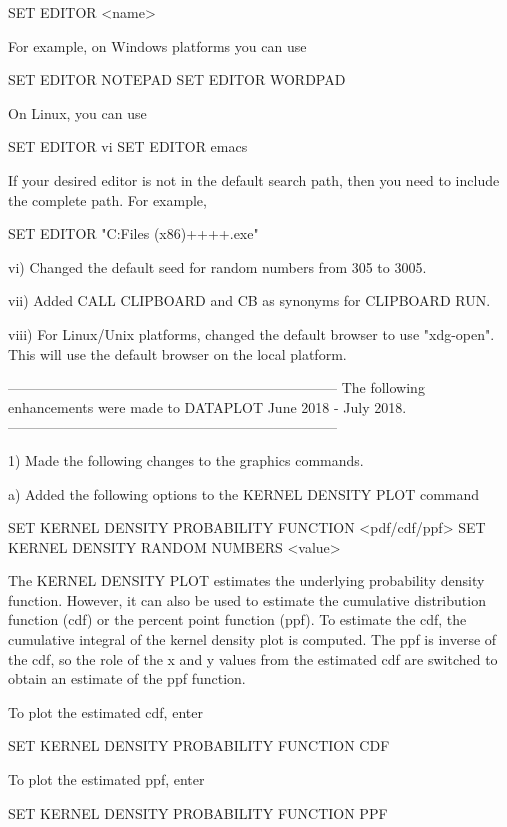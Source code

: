              SET EDITOR <name>

         For example, on Windows platforms you can use

             SET EDITOR NOTEPAD
             SET EDITOR WORDPAD

         On Linux, you can use

             SET EDITOR vi
             SET EDITOR emacs

         If your desired editor is not in the default search path, then
         you need to include the complete path.  For example,

             SET EDITOR "C:\Program Files (x86)\notepad++\notepad++.exe"

     vi) Changed the default seed for random numbers from 305 to 3005.

    vii) Added CALL CLIPBOARD and CB as synonyms for CLIPBOARD RUN.

   viii) For Linux/Unix platforms, changed the default browser to use
         "xdg-open".  This will use the default browser on the local
         platform.

-----------------------------------------------------------------------
The following enhancements were made to DATAPLOT
June 2018 - July 2018.
-----------------------------------------------------------------------

 1) Made the following changes to the graphics commands.

    a) Added the following options to the KERNEL DENSITY PLOT command

          SET KERNEL DENSITY PROBABILITY FUNCTION <pdf/cdf/ppf>
          SET KERNEL DENSITY RANDOM NUMBERS <value>

       The KERNEL DENSITY PLOT estimates the underlying probability
       density function.  However, it can also be used to estimate
       the cumulative distribution function (cdf) or the percent point
       function (ppf).  To estimate the cdf, the cumulative integral of
       the kernel density plot is computed.  The ppf is inverse of the
       cdf, so the role of the x and y values from the estimated cdf are
       switched to obtain an estimate of the ppf function.

       To plot the estimated cdf, enter
 
          SET KERNEL DENSITY PROBABILITY FUNCTION CDF

       To plot the estimated ppf, enter
 
          SET KERNEL DENSITY PROBABILITY FUNCTION PPF

